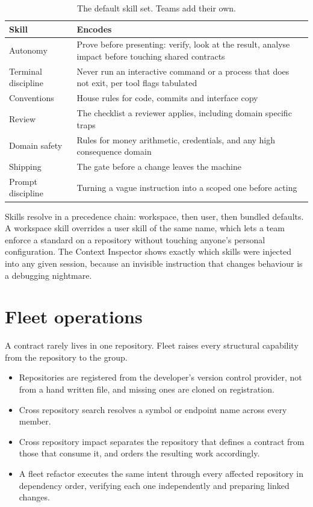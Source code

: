 \begin{table}[h]
\centering
\small
\begin{tabularx}{\textwidth}{l X}
\toprule
\textbf{Skill} & \textbf{Encodes} \\
\midrule
Autonomy & Prove before presenting: verify, look at the result, analyse impact before touching shared contracts \\
Terminal discipline & Never run an interactive command or a process that does not exit, per tool flags tabulated \\
Conventions & House rules for code, commits and interface copy \\
Review & The checklist a reviewer applies, including domain specific traps \\
Domain safety & Rules for money arithmetic, credentials, and any high consequence domain \\
Shipping & The gate before a change leaves the machine \\
Prompt discipline & Turning a vague instruction into a scoped one before acting \\
\bottomrule
\end{tabularx}
\caption{The default skill set. Teams add their own.}
\end{table}

Skills resolve in a precedence chain: workspace, then user, then bundled defaults. A workspace
skill overrides a user skill of the same name, which lets a team enforce a standard on a
repository without touching anyone's personal configuration. The Context Inspector shows
exactly which skills were injected into any given session, because an invisible instruction
that changes behaviour is a debugging nightmare.

\section{Fleet operations}

A contract rarely lives in one repository. Fleet raises every structural capability from the
repository to the group.

\begin{itemize}
  \item Repositories are registered from the developer's version control provider, not from a
  hand written file, and missing ones are cloned on registration.
  \item Cross repository search resolves a symbol or endpoint name across every member.
  \item Cross repository impact separates the repository that defines a contract from those
  that consume it, and orders the resulting work accordingly.
  \item A fleet refactor executes the same intent through every affected repository in
  dependency order, verifying each one independently and preparing linked changes.
\end{itemize}

